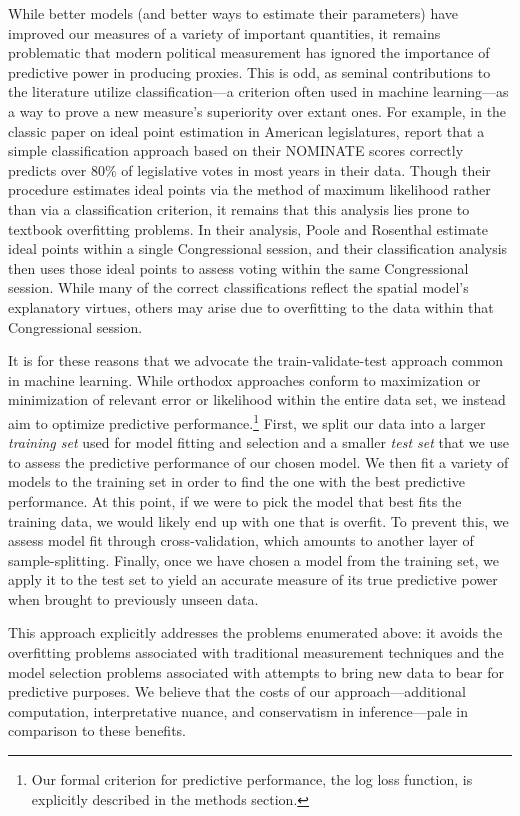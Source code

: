 While better models (and better ways to estimate their parameters) have improved our measures of a variety of important quantities, it remains problematic that modern political measurement has ignored the importance of predictive power in producing proxies.
This is odd, as seminal contributions to the literature utilize classification---a criterion often used in machine learning---as a way to prove a new measure's superiority over extant ones. For example, in the classic paper on ideal point estimation in American legislatures, \citet[Table 3]{poole1985} report that a simple classification approach based on their NOMINATE scores correctly predicts over 80\% of legislative votes in most years in their data. Though their procedure estimates ideal points via the method of maximum likelihood rather than via a classification criterion, it remains that this analysis lies prone to textbook overfitting problems.
In their analysis, Poole and Rosenthal estimate ideal points within a single Congressional session, and their classification analysis then uses those ideal points to assess voting within the same Congressional session.
While many of the correct classifications reflect the spatial model's explanatory virtues, others may arise due to overfitting to the data within that Congressional session.

It is for these reasons that we advocate the train-validate-test approach common in machine learning.
While orthodox approaches conform to maximization or minimization of relevant error or likelihood within the entire data set, we instead aim to optimize predictive performance.\footnote{Our formal criterion for predictive performance, the log loss function, is explicitly described in the methods section.}
First, we split our data into a larger \emph{training set} used for model fitting and selection and a smaller \emph{test set} that we use to assess the predictive performance of our chosen model.
We then fit a variety of models to the training set in order to find the one with the best predictive performance.
At this point, if we were to pick the model that best fits the training data, we would likely end up with one that is overfit.
To prevent this, we assess model fit through cross-validation, which amounts to another layer of sample-splitting.
Finally, once we have chosen a model from the training set, we apply it to the test set to yield an accurate measure of its true predictive power when brought to previously unseen data.

This approach explicitly addresses the problems enumerated above: it avoids the overfitting problems associated with traditional measurement techniques and the model selection problems associated with attempts to bring new data to bear for predictive purposes.
We believe that the costs of our approach---additional computation, interpretative nuance, and conservatism in inference---pale in comparison to these benefits.

